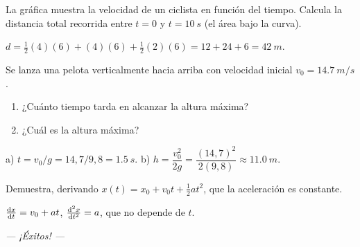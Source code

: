\documentclass[11pt]{article}
\begin{document}
\begin{preguntas}

\pregunta[3] La gráfica muestra la velocidad de un ciclista en función
del tiempo. Calcula la distancia total recorrida entre $t=0$ y
$t=\qty{10}{s}$ (el área bajo la curva).

\begin{center}
\end{center}
\begin{solucion}[4cm]
$d = \tfrac12(4)(6) + (4)(6) + \tfrac12(2)(6) = 12 + 24 + 6 = \qty{42}{m}$.
\end{solucion}

\pregunta[3] Se lanza una pelota verticalmente hacia arriba con velocidad
inicial $v_0 = \qty{14,7}{m/s}$.
\begin{enumerate}[label=\alph*)]
  \item ¿Cuánto tiempo tarda en alcanzar la altura máxima?
  \item ¿Cuál es la altura máxima?
\end{enumerate}
\begin{solucion}[5cm]
a) $t = v_0/g = 14{,}7/9{,}8 = \qty{1,5}{s}$.\quad
b) $h = \dfrac{v_0^2}{2g} = \dfrac{(14{,}7)^2}{2(9{,}8)} \approx \qty{11,0}{m}$.
\end{solucion}

\pregunta[2] Demuestra, derivando $x(t) = x_0 + v_0 t + \tfrac12 a t^2$,
que la aceleración es constante.
\begin{solucion}[3cm]
$\frac{\mathrm{d}x}{\mathrm{d}t} = v_0 + a t$, \quad $\frac{\mathrm{d}^2x}{\mathrm{d}t^2} = a$, que no depende de $t$.
\end{solucion}

\end{preguntas}

\vfill
\begin{center}
  \small\itshape\color{mmcGris}— ¡Éxitos! —
\end{center}
\end{document}
